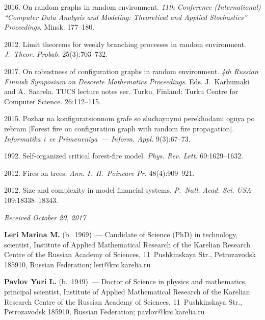 \begin{multicols}{2}
{{\begin{thebibliography}{99}
 2016. On random graphs in random environment.
 \textit{11th Conference
(International) ``Computer Data Analysis and Modeling: Theoretical and Applied Stochastics''
Proceedings}. Minsk. 177--180.

2012. Limit theorems
for weekly branching processes in random environment. \textit{J.~Theor. 
Probab.} 25(3):703--732.

 2017. On robustness of configuration graphs in random
environment. \textit{4th Russian Finnish Symposium on Descrete
Mathematics Proceedings}. Eds. J.~Karhum$\ddot{\mbox{a}}$ki
and A.~Saarela. TUCS lecture notes ser. Turku, Finland: 
Turku Centre for Computer Science. 26:112--115.

 2015. Pozhar na konfiguratsionnom grafe so sluchaynymi 
perekhodami ognya
po rebram [Forest fire on configuration graph with random fire propagation]. 
\textit{Informatika i~ee Primeneniya~--- Inform. Appl.} 9(3):67--73.

 1992. Self-organized critical forest-fire model.
\textit{Phys. Rev. Lett.} 69:1629--1632.

 2012. Fires on trees. \textit{Ann. I.~H.~Poincare
Pr.} 48(4):909--921.

 2012. Size and complexity in model
financial systems. \textit{P.~Natl. Acad. Sci. USA} 109:18338--18343.
\end{thebibliography}

 }
 }

\end{multicols}

\vspace*{-3pt}

\hfill{\small\textit{Received October 20, 2017}}


\Contr

\noindent
\textbf{Leri Marina M.} (b.\ 1969)~--- 
Candidate of Science (PhD) in technology, scientist, Institute 
of Applied Mathematical Research of the Karelian Research Centre 
of the Russian Academy of Sciences, 
11~Pushkinskaya Str., Petrozavodsk 185910, Russian Federation; 
\mbox{leri@krc.karelia.ru}

\vspace*{3pt}



\noindent
\textbf{Pavlov Yuri L.} (b.\ 1949)~--- 
Doctor of Science in physics and mathematics, principal scientist,
Institute of Applied Mathematical Research of the Karelian Research Centre 
of the Russian Academy of Sciences, 11~Pushkinskaya Str., Petrozavodsk 185910, 
Russian Federation; \mbox{pavlov@krc.karelia.ru}


\label{end\stat}


\renewcommand{\bibname}{\protect\rm Литература} 